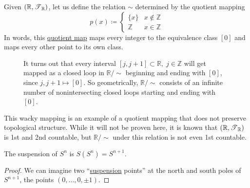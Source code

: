 	\begin{definition}
	  \label{def:hawaiian-earring}
    Given $(\mathbb{R}, \operatorname{\mathscr{T}}_{\mathbb{R}})$, let us define the relation $\sim$ determined by the quotient mapping 
    \begin{equation}
      p(x) \coloneqq \begin{cases} \{x\} & x \not\in \mathbb{Z} \\ \mathbb{Z} & x \in \mathbb{Z} \end{cases}
    \end{equation}
    In words, this \hyperref[def:quotient-map]{quotient map} maps every integer to the equivalence class $[0]$ and maps every other point to its own class. 

    \begin{figure}[H]
      \centering 
      \caption{It turns out that every interval $[j, j+1] \subset \mathbb{R}, \; j \in \mathbb{Z}$ will get mapped as a closed loop in $\mathbb{R} / \sim$ beginning and ending with $[0]$, since $j, j+1 \mapsto [0]$. So geometrically, $\mathbb{R} / \sim$ consists of an infinite number of nonintersecting closed loops starting and ending with $[0]$. }
      \label{fig:integer}
    \end{figure}

    This wacky mapping is an example of a quotient mapping that does not preserve topological structure. While it will not be proven here, it is known that $(\mathbb{R}, \operatorname{\mathscr{T}}_{\mathbb{R}})$ is 1st and 2nd countable, but $\mathbb{R} / \sim$ under this relation is not even 1st countable. 
	\end{definition}

	\begin{example}
	  \label{ex:suspension-of-sphere}
 
		The suspension of $S^n$ is $S(S^n) = S^{n+1}$.
	\end{example}
	\begin{proof}
		We can imagine two ``\hyperref[def:suspension]{suspension} points'' at the north and south poles of $S^{n+1}$, the points $(0, \ldots, 0, \pm1)$. 
	\end{proof}


